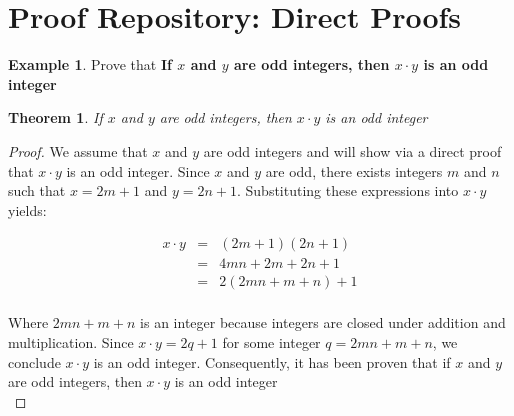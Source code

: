 \documentclass{book}
\newtheorem{theorem}{Theorem}[section]
\theoremstyle{definition}
\newtheorem{example}{Example}[definition]
\theoremstyle{remark}
\newcommand{\m}{\cdot}
\begin{document}
\section{Proof Repository: Direct Proofs}
\begin{example}

Prove that {\bf If $x$ and $y$ are odd integers, then $x \m y$ is an odd integer} \\

\begin{tcolorbox}
	\begin{theorem}
		If $x$ and $y$ are odd integers, then $x \m y$ is an odd integer
	\end{theorem}
\end{tcolorbox}

\begin{proof}
We assume that $x$ and $y$ are odd integers and will show via a direct proof that $x \m y$ is an odd integer. Since $x$ and $y$ are odd, there exists integers $m$ and $n$ such that $x = 2m + 1$ and $y = 2n + 1$. Substituting these expressions into $x \m y$ yields:

\begin{eqnarray*}
	x \m y & = & (2m + 1)(2n + 1) \nonumber \\
	& = & 4mn + 2m + 2n + 1 \nonumber \\
	& = & 2(2mn + m + n) + 1 \nonumber \\
\end{eqnarray*}

Where $2mn + m + n$ is an integer because integers are closed under addition and multiplication. Since $x \m y = 2q + 1$ for some integer $q = 2mn + m + n$, we conclude $x \m y$ is an odd integer. Consequently, it has been proven that if $x$ and $y$ are odd integers, then $x \m y$ is an odd integer \\
\end{proof}
\end{example}
\end{document}
